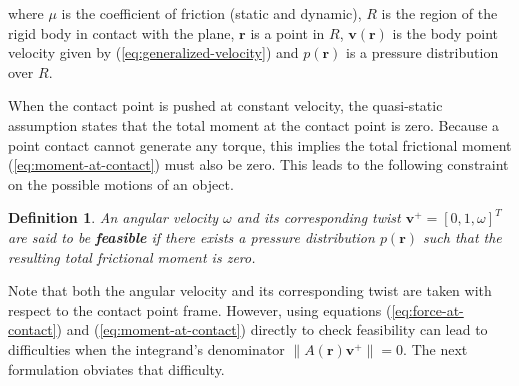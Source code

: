 \documentclass[conference]{IEEEtran}
\newtheorem{definition}{Definition}
\begin{document}
where $\mu$ is the coefficient of friction (static and dynamic), $R$
is the region of the rigid body in contact with the plane,
$\mathbf{r}$ is a point in $R$, $\mathbf{v}(\mathbf{r})$ is the body
point velocity given by (\ref{eq:generalized-velocity}) and
$p(\mathbf{r})$ is a pressure distribution over $R$.

When the contact point is pushed at constant velocity, the
quasi-static assumption states that the total moment at the contact
point is zero. Because a point contact cannot generate any torque,
this implies the total frictional moment (\ref{eq:moment-at-contact})
must also be zero. This leads to the following constraint on the
possible motions of an object.
\begin{definition}
  An angular velocity $\omega$ and its corresponding twist
  $\mathbf{v}^+ = [0,1,\omega]^T$ are said to be \textbf{feasible} if
  there exists a pressure distribution $p(\mathbf{r})$ such that the
  resulting total frictional moment is zero.
\end{definition}
Note that both the angular velocity and its corresponding twist are
taken with respect to the contact point frame. However, using
equations (\ref{eq:force-at-contact}) and (\ref{eq:moment-at-contact})
directly to check feasibility can lead to difficulties when the
integrand's denominator $\lVert A(\mathbf{r})\mathbf{v}^+\rVert =
0$. The next formulation obviates that difficulty.
\end{document}

